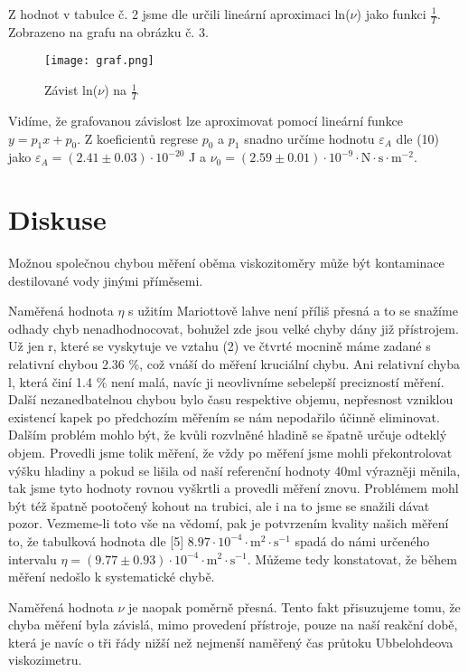 \documentclass{article}
\begin{document}
\par Z hodnot v tabulce č. 2 jsme dle určili lineární aproximaci ln($\nu$) jako funkci $\frac{1}{T}$. Zobrazeno na grafu na obrázku č. 3.
\begin{figure}[H]
\centering
\caption{Závist ln($\nu$) na $\frac{1}{T}$}
\texttt{[image: graf.png]}
\end{figure}
\par Vidíme, že grafovanou závislost lze aproximovat pomocí lineární funkce $y = p_{1}x + p_{0}$. Z koeficientů regrese $p_{0}$ a $p_{1}$ snadno určíme hodnotu $\varepsilon_{A}$ dle (10) jako $\varepsilon_{A} = (2.41\pm0.03)\cdot\mathrm{10^{-20}}$ J a $\nu_{0} =  (2.59\pm0.01)\cdot10^{-9} \cdot \mathrm{N \cdot s \cdot m^{-2}}$.
\section*{Diskuse}
\par Možnou společnou chybou měření oběma viskozitoměry může být kontaminace destilované vody jinými příměsemi.
\par Naměřená hodnota $\eta$ s užitím Mariottově lahve není příliš přesná a to se snažíme odhady chyb nenadhodnocovat, bohužel zde jsou velké chyby dány již přístrojem. Už jen r, které se vyskytuje ve vztahu (2) ve čtvrté mocnině máme zadané s relativní chybou 2.36 $\%$, což vnáší do měření kruciální chybu. Ani relativní chyba l, která činí 1.4 $\%$ není malá, navíc ji neovlivníme sebelepší precizností měření. Další nezanedbatelnou chybou bylo času respektive objemu, nepřesnost vzniklou existencí kapek po předchozím měřením se nám nepodařilo účinně eliminovat. Dalším problém mohlo být, že kvůli rozvlněné hladině se špatně určuje odteklý objem. Provedli jsme tolik měření, že vždy po měření jsme mohli překontrolovat výšku hladiny a pokud se lišila od naší referenční hodnoty 40ml výrazněji měnila, tak jsme tyto hodnoty rovnou vyškrtli a provedli měření znovu. Problémem mohl být též špatně pootočený kohout na trubici, ale i na to jsme se snažili dávat pozor. Vezmeme-li toto vše na vědomí, pak je potvrzením kvality našich měření to, že tabulková hodnota dle [5] $8.97\cdot 10^{-4} \cdot \mathrm{m^{2} \cdot s^{-1}}$ spadá do námi určeného intervalu $\eta = (9.77\pm0.93)\cdot \mathrm{10^{-4} \cdot m^{2} \cdot s^{-1}}$. Můžeme tedy konstatovat, že během měření nedošlo k systematické chybě.
\par Naměřená hodnota $\nu$ je naopak poměrně přesná. Tento fakt přisuzujeme tomu, že chyba měření byla závislá, mimo provedení přístroje, pouze na naší reakční době, která je navíc o tři řády nižší než nejmenší naměřený čas průtoku Ubbelohdeova viskozimetru.
\end{document}
